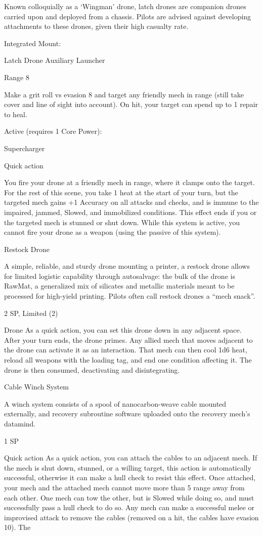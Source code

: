   Known colloquially as a ‘Wingman’ drone, latch drones are companion drones carried upon and
  deployed from a chassis. Pilots are advised against developing attachments to these drones, given their
  high casualty rate.


   Integrated Mount:

  Latch Drone
  Auxiliary Launcher

   Range 8

   Make a grit roll vs evasion 8 and target any friendly mech in range (still take cover and line of sight into
   account). On hit, your target can spend up to 1 repair to heal.


  Active (requires 1 Core Power):

   Supercharger

   Quick action

  You fire your drone at a friendly mech in range, where it clamps onto the target. For the rest of this
   scene, you take 1 heat at the start of your turn, but the targeted mech gains +1 Accuracy on all attacks
   and checks, and is immune to the impaired, jammed, Slowed, and immobilized conditions. This effect
   ends if you or the targeted mech is stunned or shut down. While this system is active, you cannot fire
  your drone as a weapon (using the passive of this system).

Restock Drone

A simple, reliable, and sturdy drone mounting a printer, a restock drone allows for limited logistic capability
through autosalvage: the bulk of the drone is RawMat, a generalized mix of silicates and metallic materials
meant to be processed for high-yield printing. Pilots often call restock drones a “mech snack”.

2 SP, Limited (2)

Drone
As a quick action, you can set this drone down in any adjacent space. After your turn ends, the
drone primes. Any allied mech that moves adjacent to the drone can activate it as an interaction.
That mech can then cool 1d6 heat, reload all weapons with the loading tag, and end one
condition affecting it. The drone is then consumed, deactivating and disintegrating.


Cable Winch System

A winch system consists of a spool of nanocarbon-weave cable mounted externally, and recovery
subroutine software uploaded onto the recovery mech’s datamind.

1 SP

Quick action
As a quick action, you can attach the cables to an adjacent mech. If the mech is shut down,
stunned, or a willing target, this action is automatically successful, otherwise it can make a hull
check to resist this effect. Once attached, your mech and the attached mech cannot move more
than 5 range away from each other. One mech can tow the other, but is Slowed while doing so,
and must successfully pass a hull check to do so. Any mech can make a successful melee or
improvised attack to remove the cables (removed on a hit, the cables have evasion 10). The




